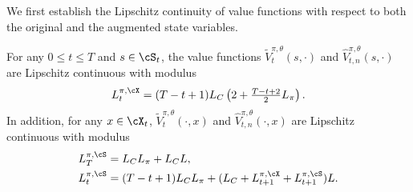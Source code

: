 \documentclass[9pt]{article}
\numberwithin{equation}{section}
\begin{document}
We first establish the Lipschitz continuity of value functions with respect to both the original and the augmented state variables.

\begin{lemma}\label{lemma_fin_soc_pol_eval_val_lip_X}
    For any $0 \leq t \leq T$ and $s \in \cS_t$, the value functions $\tilde V_t^{\pi, \theta}(s, \cdot)$ and $\hat V_{t,n}^{\pi, \theta}(s, \cdot)$ are Lipschitz continuous with modulus
    \begin{align}\label{soc_finite_lipschitz_value_pi_x}
    L^{\pi, \cX}_{t} = (T-t+1)L_C\left(2 + \tfrac{T-t+2}{2}L_\pi\right). 
    \end{align}
    In addition, for any $x \in \cX_t$,  $\tilde V_t^{\pi, \theta}(\cdot, x)$ and $\hat V_{t,n}^{\pi, \theta}(\cdot, x)$ are Lipschitz continuous with modulus
    \begin{align}
        L^{\pi, \cS}_{T} & = L_C L_\pi + L_C L,  \nonumber \\
        L^{\pi, \cS}_{t} & = (T-t+1) L_C L_\pi + (L_C + L^{\pi, \cX}_{t+1} + L^{\pi, \cS}_{t+1})L . \label{soc_finite_lipschitz_value_pi_s}
    \end{align}
\end{lemma}
\end{document}
